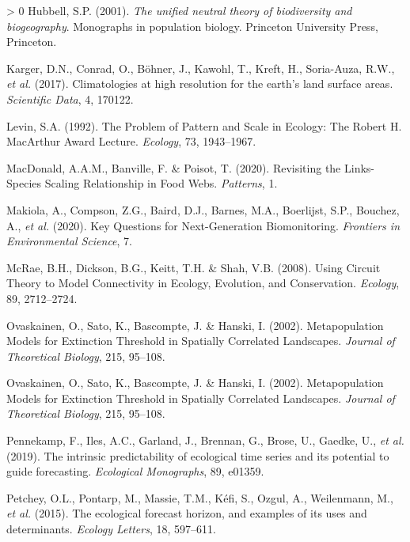 \documentclass[11pt]{article}
\newlength{\cslhangindent}
\newenvironment{CSLReferences}[3] %
 {%
  \setlength{\parindent}{0pt}
  \ifodd #1 \everypar{\setlength{\hangindent}{\cslhangindent}}\ignorespaces\fi
  \ifnum #2 > 0
  \setlength{\parskip}{#2\baselineskip}
  \fi
 }%
 {}
\begin{document}
\begin{CSLReferences}{1}{0}
\leavevmode\hypertarget{ref-Hubbell2001UniNeu}{}%
Hubbell, S.P. (2001). \emph{The unified neutral theory of biodiversity
and biogeography}. Monographs in population biology. Princeton
University Press, Princeton.

\leavevmode\hypertarget{ref-Karger2017CliHig}{}%
Karger, D.N., Conrad, O., Böhner, J., Kawohl, T., Kreft, H., Soria-Auza,
R.W., \emph{et al.} (2017). Climatologies at high resolution for the
earth's land surface areas. \emph{Scientific Data}, 4, 170122.

\leavevmode\hypertarget{ref-Levin1992ProPat}{}%
Levin, S.A. (1992). The Problem of Pattern and Scale in Ecology: The
Robert H. MacArthur Award Lecture. \emph{Ecology}, 73, 1943--1967.

\leavevmode\hypertarget{ref-MacDonald2020RevLin}{}%
MacDonald, A.A.M., Banville, F. \& Poisot, T. (2020). Revisiting the
Links-Species Scaling Relationship in Food Webs. \emph{Patterns}, 1.

\leavevmode\hypertarget{ref-Makiola2020KeyQue}{}%
Makiola, A., Compson, Z.G., Baird, D.J., Barnes, M.A., Boerlijst, S.P.,
Bouchez, A., \emph{et al.} (2020). Key Questions for Next-Generation
Biomonitoring. \emph{Frontiers in Environmental Science}, 7.

\leavevmode\hypertarget{ref-McRae2008UsiCir}{}%
McRae, B.H., Dickson, B.G., Keitt, T.H. \& Shah, V.B. (2008). Using
Circuit Theory to Model Connectivity in Ecology, Evolution, and
Conservation. \emph{Ecology}, 89, 2712--2724.

\leavevmode\hypertarget{ref-Ovaskainen2002MetMod}{}%
Ovaskainen, O., Sato, K., Bascompte, J. \& Hanski, I. (2002).
Metapopulation Models for Extinction Threshold in Spatially Correlated
Landscapes. \emph{Journal of Theoretical Biology}, 215, 95--108.

\leavevmode\hypertarget{ref-Ovaskainen2002MetMod}{}%
Ovaskainen, O., Sato, K., Bascompte, J. \& Hanski, I. (2002).
Metapopulation Models for Extinction Threshold in Spatially Correlated
Landscapes. \emph{Journal of Theoretical Biology}, 215, 95--108.

\leavevmode\hypertarget{ref-Pennekamp2019IntPre}{}%
Pennekamp, F., Iles, A.C., Garland, J., Brennan, G., Brose, U., Gaedke,
U., \emph{et al.} (2019). The intrinsic predictability of ecological
time series and its potential to guide forecasting. \emph{Ecological
Monographs}, 89, e01359.

\leavevmode\hypertarget{ref-Petchey2015EcoFor}{}%
Petchey, O.L., Pontarp, M., Massie, T.M., Kéfi, S., Ozgul, A.,
Weilenmann, M., \emph{et al.} (2015). The ecological forecast horizon,
and examples of its uses and determinants. \emph{Ecology Letters}, 18,
597--611.


\end{CSLReferences}
\end{document}
